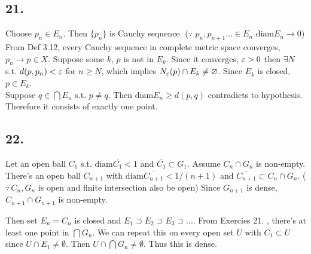 \documentclass[11pt]{article}
\begin{document}
\subsection*{21.}

Choose $p_n \in E_n$. Then $\{p_n\}$ is Cauchy sequence. ($\because$ $p_n, p_{n+1}... \in E_n$ $\text{diam} E_n \to 0$) From Def 3.12, every Cauchy sequence in complete metric space converges, $p_n \to p \in X$. Suppose some $k$, $p$ is not in $E_k$. Since it converges, $\varepsilon > 0$ then $\exists N$ s.t. $d(p,p_n) < \varepsilon$ for $n \geq N$, which implies $N_\varepsilon(p) \cap E_k \neq \varnothing$. Since $E_k$ is closed, $p \in E_k$.\\
Suppose $q \in \bigcap E_n$ s.t. $p \neq q$. Then $\text{diam} E_n \geq d(p,q)$ contradicts to hypothesis. Therefore it consists of exactly one point.

\subsection*{22.}

Let an open ball $C_1$ s.t. $\text{diam} \overline{C_1} < 1$ and $\overline{C_1} \subset G_1$. Assume $C_n \cap G_n$ is non-empty. There's an open ball $C_{n+1}$ with $\text{diam} \overline{C_{n+1}} < 1/(n+1)$ and $\overline{C_{n+1}} \subset C_n \cap G_n$. ($\because \, C_n, G_n$ is open and finite intersection also be open) Since $G_{n+1}$ is dense, $C_{n+1} \cap G_{n+1}$ is non-empty.

Then set $E_n=\overline{C_n}$ is closed and $E_1 \supset E_2 \supset E_3 \supset ...$. From Exercies 21. , there's at least one point in $\bigcap G_n$. We can repeat this on every open set $U$ with $C_1 \subset U$ since $U \cap E_1 \neq \emptyset$. Then $U \cap \bigcap G_n \neq \emptyset$. Thus this is dense.
\end{document}
